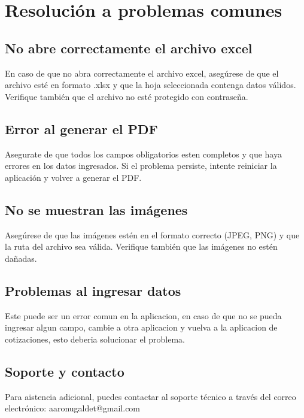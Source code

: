 \documentclass{Pretexto/bluereport}
\begin{document}
\section{Resolución a problemas comunes}

\subsection{No abre correctamente el archivo excel}

En caso de que no abra correctamente el archivo excel, asegúrese de que el archivo esté en formato .xlsx y que la hoja seleccionada contenga datos válidos. Verifique también que el archivo no esté protegido con contraseña.

\subsection{Error al generar el PDF}

Asegurate de que todos los campos obligatorios esten completos y que haya errores en los datos ingresados. Si el problema persiste, intente reiniciar la aplicación y volver a generar el PDF.

\subsection{No se muestran las imágenes}

Asegúrese de que las imágenes estén en el formato correcto (JPEG, PNG) y que la ruta del archivo sea válida. Verifique también que las imágenes no estén dañadas.

\subsection{Problemas al ingresar datos}

Este puede ser un error comun en la aplicacion, en caso de que no se pueda ingresar algun campo, cambie a otra aplicacion y vuelva a la aplicacion de cotizaciones, esto deberia solucionar el problema.

\subsection{Soporte y contacto}

Para aistencia adicional, puedes contactar al soporte técnico a través del correo electrónico: aaronugaldet@gmail.com
\pagebreak
\end{document}
